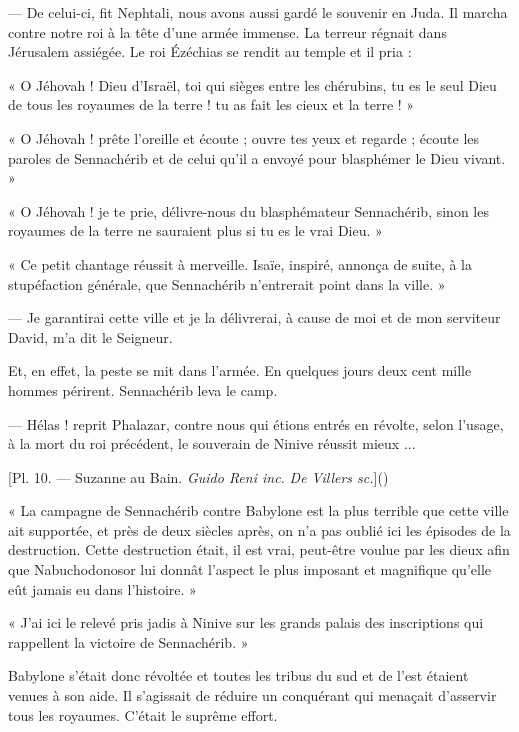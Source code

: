 \documentclass[a4paper, 11pt, oneside, polutonikogreek, french]{article}
\begin{document}
\bigskip
\centerline{\EightStarTaper}
\centerline{\EightStarTaper\EightStarTaper}
\bigskip

--- De celui-ci, fit Nephtali, nous avons aussi gardé le souvenir en Juda. Il marcha contre notre roi à la tête d'une armée immense. La terreur régnait dans Jérusalem assiégée. Le roi Ézéchias se rendit au temple et il pria :

« O Jéhovah ! Dieu d'Israël, toi qui sièges entre les chérubins, tu es le seul Dieu de tous les royaumes de la terre ! tu as fait les cieux et la terre ! »

« O Jéhovah ! prête l'oreille et écoute ; ouvre tes yeux et regarde ; écoute les paroles de Sennachérib et de celui qu'il a envoyé pour blasphémer le Dieu vivant. »

« O Jéhovah ! je te prie, délivre-nous du blasphémateur Sennachérib, sinon les royaumes de la terre ne sauraient plus si tu es le vrai Dieu. »

« Ce petit chantage réussit à merveille. Isaïe, inspiré, annonça de suite, à la stupéfaction générale, que Sennachérib n'entrerait point dans la ville. »

--- Je garantirai cette ville et je la délivrerai, à cause de moi et de mon serviteur David, m'a dit le Seigneur.

Et, en effet, la peste se mit dans l'armée. En quelques jours deux cent mille hommes périrent. Sennachérib leva le camp.

--- Hélas ! reprit Phalazar, contre nous qui étions entrés en révolte, selon l'usage, à la mort du roi précédent, le souverain de Ninive réussit mieux ...

[Pl. 10. --- Suzanne au Bain. \emph{Guido Reni inc.} \emph{De Villers sc.}]()

\bigskip
\centerline{\EightStarTaper}
\centerline{\EightStarTaper\EightStarTaper}
\bigskip

« La campagne de Sennachérib contre Babylone est la plus terrible que cette ville ait supportée, et près de deux siècles après, on n'a pas oublié ici les épisodes de la destruction. Cette destruction était, il est vrai, peut-être voulue par les dieux afin que Nabuchodonosor lui donnât l'aspect le plus imposant et magnifique qu'elle eût jamais eu dans l'histoire. »

« J'ai ici le relevé pris jadis à Ninive sur les grands palais des inscriptions qui rappellent la victoire de Sennachérib. »

Babylone s'était donc révoltée et toutes les tribus du sud et de l'est étaient venues à son aide. Il s'agissait de réduire un conquérant qui menaçait d'asservir tous les royaumes. C'était le suprême effort.
\end{document}
